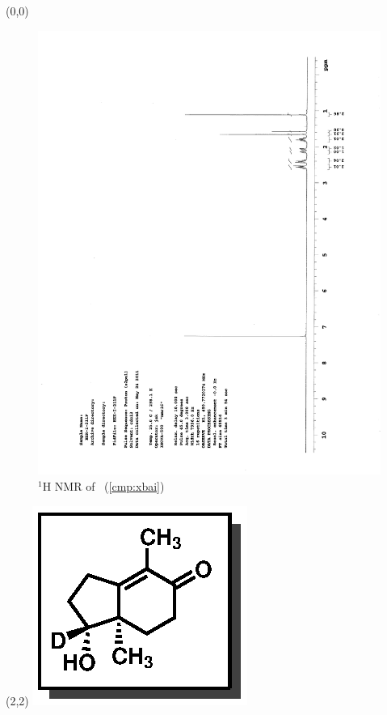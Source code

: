\begin{textblock}{20}(0,0)
\begin{figure}[htb]
\caption{$^1$H NMR of \CMPxbai\ (\ref{cmp:xbai})}
\includegraphics[scale=0.75, trim = 0mm 0mm 0mm 5mm,
clip]{chp_singlecarbon/images/nmr/xbaiH}
\vspace{-100pt}
\end{figure}
\end{textblock}
\begin{textblock}{1}(2,2)
\includegraphics[scale=0.8, angle=90]{chp_singlecarbon/images/xbai}
\end{textblock}
